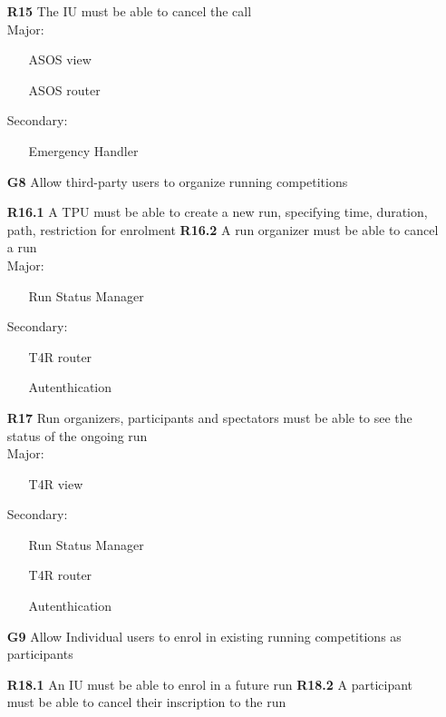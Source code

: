 \begin{itemize}
\subitem \textbf{R15} The IU must be able to cancel the call\\

Major:
\begin{itemize}
\item[\textbullet]ASOS view
\item[\textbullet]ASOS router
\end{itemize}
Secondary:
\begin{itemize}
\item[\textbullet] Emergency Handler
\end{itemize}

\item [\textbf{G8}] Allow third-party users to organize running competitions

\subitem \textbf{R16.1} A TPU must be able to create a new run, specifying time, duration, path, restriction for enrolment
\subitem \textbf{R16.2} A run organizer must be able to cancel a run \\

Major:
\begin{itemize}
\item[\textbullet]Run Status Manager
\end{itemize}
Secondary:
\begin{itemize}
\item[\textbullet]T4R router
\item[\textbullet]Autenthication
\end{itemize}

\subitem \textbf{R17} Run organizers, participants and spectators must be able to see the status of the ongoing run\\

Major:
\begin{itemize}
\item[\textbullet]T4R view
\end{itemize}
Secondary:
\begin{itemize}
\item[\textbullet]Run Status Manager
\item[\textbullet]T4R router
\item[\textbullet]Autenthication
\end{itemize}
\item [\textbf{G9}] Allow Individual users to enrol in existing running competitions as participants

\subitem \textbf{R18.1} An IU must be able to enrol in a future run
\subitem \textbf{R18.2} A participant must be able to cancel their inscription to the run \\


\end{itemize}
